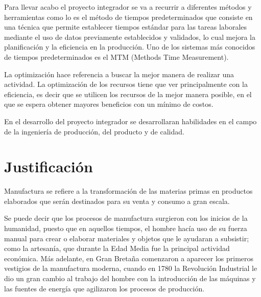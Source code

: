     Para llevar acabo el proyecto integrador se va a recurrir a diferentes métodos y herramientas como lo es el método de tiempos predeterminados que consiste en una técnica que permite establecer tiempos estándar para las tareas laborales mediante el uso de datos previamente establecidos y validados, lo cual mejora la planificación y la eficiencia en la producción.
    Uno de los sistemas más conocidos de tiempos predeterminados es el MTM (Methods Time Measurement).
    
    La optimización hace referencia a buscar la mejor manera de realizar una actividad. La optimización de los recursos tiene que ver principalmente con la eficiencia, es decir que se utilicen los recursos de la mejor manera posible, en el que se espera obtener mayores beneficios con un mínimo de costos.
    
    En el desarrollo del proyecto integrador se desarrollaran habilidades en el campo de la ingeniería de producción, del producto y de calidad.
    \section{Justificación}
    
    Manufactura se refiere a la transformación de las materias primas en productos elaborados que serán destinados para su venta y consumo a gran escala.
    
    Se puede decir que los procesos de manufactura surgieron con los inicios de la humanidad, puesto que en aquellos tiempos, el hombre hacía uso de su fuerza manual para crear o elaborar materiales y objetos que le ayudaran a subsistir; como la artesanía, que durante la Edad Media fue la principal actividad económica.
    Más adelante, en Gran Bretaña comenzaron a aparecer los primeros vestigios de la manufactura moderna, cuando en 1780 la Revolución Industrial le dio un gran cambio al trabajo del hombre con la introducción de las máquinas y las fuentes de energía que agilizaron los procesos de producción.
    
